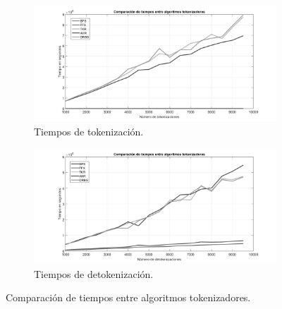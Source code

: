 \begin{figure}
  \centering
  \begin{subfigure}{1\textwidth}
    \begin{center}
      \includegraphics[width=1\linewidth]
        {../../../../../diagramas_comunes/desempenio/tok_todos_bn}
      \caption{Tiempos de tokenización.}
    \end{center}
  \end{subfigure}
  \begin{subfigure}{0.9\textwidth}
    \begin{center}
      \includegraphics[width=1\linewidth]{diagramas/detok_todos_bn}
      \caption{Tiempos de detokenización.}
    \end{center}
  \end{subfigure}
  \caption{Comparación de tiempos entre algoritmos tokenizadores.}
  \label{figura:tok_todos}
\end{figure}

